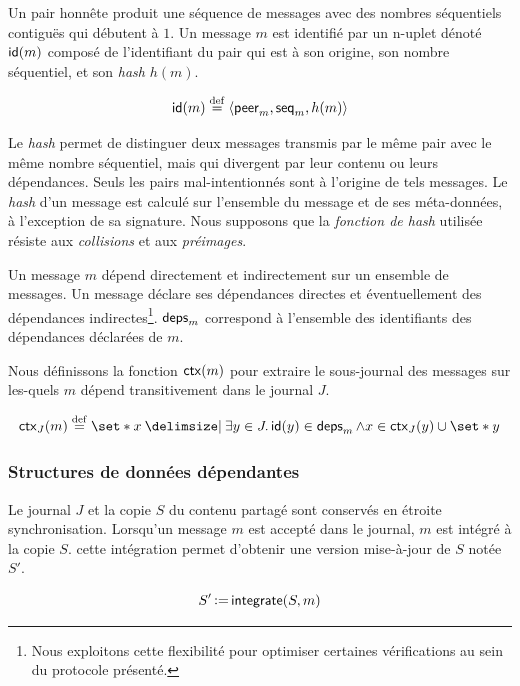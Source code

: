 Un pair honnête produit une séquence de messages avec des nombres séquentiels contiguës qui débutent à $1$.
Un message $m$ est identifié par un n-uplet dénoté $\trm{id}(m)$ composé de l'identifiant du pair qui est à son origine, son nombre séquentiel, et son \emph{hash} $h(m)$.

\begin{equation*}
    \trm{id}(m) \defeq \tuple*{\trm{peer}_m, \trm{seq}_m, h(m)}
\end{equation*}

Le \emph{hash} permet de distinguer deux messages transmis par le même pair avec le même nombre séquentiel, mais qui divergent par leur contenu ou leurs dépendances.
Seuls les pairs mal-intentionnés sont à l'origine de tels messages.
Le \emph{hash} d'un message est calculé sur l'ensemble du message et de ses méta-données, à l'exception de sa signature.
Nous supposons que la \emph{fonction de hash} utilisée résiste aux \emph{collisions} et aux \emph{préimages}.

Un message $m$ dépend directement et indirectement sur un ensemble de messages.
Un message déclare ses dépendances directes et éventuellement des dépendances indirectes\footnote{Nous exploitons cette flexibilité pour optimiser certaines vérifications au sein du protocole présenté.}.
$\trm{deps}_m$ correspond à l'ensemble des identifiants des dépendances déclarées de $m$.

Nous définissons la fonction $\trm{ctx}(m)$ pour extraire le sous-journal des messages sur les-quels $m$ dépend transitivement dans le journal $J$.

\begin{equation*}
    \trm{ctx}_J(m) \defeq \set*{ x \given \exists y \in J \qsep \trm{id}(y) \in \trm{deps}_m \land x \in \trm{ctx}_J(y) \cup \set*{y}}
\end{equation*}


\subsubsection{Structures de données dépendantes}

Le journal $J$ et la copie $S$ du contenu partagé sont conservés en étroite synchronisation.
Lorsqu'un message $m$ est accepté dans le journal, $m$ est intégré à la copie $S$.
cette intégration permet d'obtenir une version mise-à-jour de $S$ notée $S'$.

\begin{equation*}
    S' \assign \trm{integrate}(S, m)
\end{equation*}

